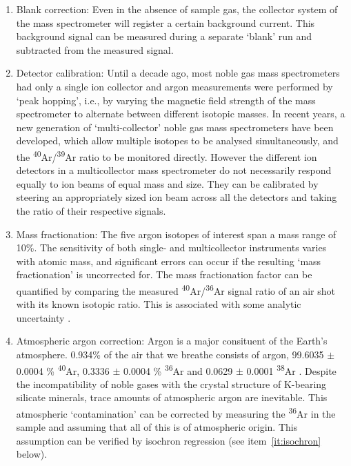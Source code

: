 \documentclass{article}
\begin{document}
\begin{enumerate}
\item Blank correction: Even in the absence of sample gas, the
  collector system of the mass spectrometer will register a certain
  background current. This background signal can be measured during a
  separate `blank' run and subtracted from the measured signal.
\item Detector calibration: Until a decade ago, most noble gas mass
  spectrometers had only a single ion collector and argon measurements
  were performed by `peak hopping', i.e., by varying the magnetic
  field strength of the mass spectrometer to alternate between
  different isotopic masses. In recent years, a new generation of
  `multi-collector' noble gas mass spectrometers have been developed,
  which allow multiple isotopes to be analysed simultaneously, and the
  \textsuperscript{40}Ar/\textsuperscript{39}Ar ratio to be monitored
  directly. However the different ion detectors in a multicollector
  mass spectrometer do not necessarily respond equally to ion beams of
  equal mass and size. They can be calibrated by steering an
  appropriately sized ion beam across all the detectors and taking the
  ratio of their respective signals.
\item Mass fractionation: The five argon isotopes of interest span a
  mass range of 10\%. The sensitivity of both single- and
  multicollector instruments varies with atomic mass, and significant
  errors can occur if the resulting `mass fractionation' is
  uncorrected for. The mass fractionation factor can be quantified by
  comparing the measured \textsuperscript{40}Ar/\textsuperscript{36}Ar
  signal ratio of an air shot with its known isotopic ratio. This is
  associated with some analytic uncertainty \citep[e.g., 298.56 $\pm$
    0.31,][]{lee2006}.
\item\label{it:atmospheric} Atmospheric argon correction: Argon is a
  major consituent of the Earth's atmosphere. 0.934\% of the air that
  we breathe consists of argon, 99.6035 $\pm$ 0.0004 \%
  \textsuperscript{40}Ar, 0.3336 $\pm$ 0.0004 \%
  \textsuperscript{36}Ar and 0.0629 $\pm$ 0.0001
  \textsuperscript{38}Ar \citep{lee2006}. Despite the incompatibility
  of noble gases with the crystal structure of K-bearing silicate
  minerals, trace amounts of atmospheric argon are inevitable. This
  atmospheric `contamination' can be corrected by measuring the
  \textsuperscript{36}Ar in the sample and assuming that all of this
  is of atmospheric origin. This assumption can be verified by
  isochron regression (see item~\ref{it:isochron} below).

\end{enumerate}
\end{document}
